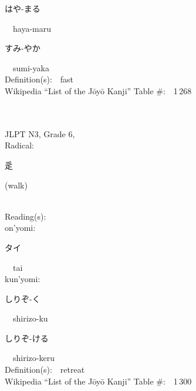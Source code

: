 \begin{multicols}{2}
{\hspace*{2em}}{\begin{CJK}{UTF8}{min} はや-まる \end{CJK}}\ \ haya-maru\ \ \\
{\hspace*{2em}}{\begin{CJK}{UTF8}{min} すみ-やか \end{CJK}}\ \ sumi-yaka\ \ \\
Definition(s):\ \ fast \\
Wikipedia ``List of the J\=oy\=o Kanji'' Table \#:\ \ 1\,268 \\
\ \ \\
{\fontsize{34pt}{40pt}  }\ \ \\  %
{JLPT N3, Grade 6, \\Radical:\ \ {\begin{CJK}{UTF8}{min} 辵 \end{CJK}} (walk) } \\
Reading(s):\ \ \\
{\hspace*{1em}}on'yomi:\ \ \\
{\hspace*{2em}}{\begin{CJK}{UTF8}{min} タイ \end{CJK}}\ \ tai\ \ \\
{\hspace*{1em}}kun'yomi:\ \ \\
{\hspace*{2em}}{\begin{CJK}{UTF8}{min} しりぞ-く \end{CJK}}\ \ shirizo-ku\ \ \\
{\hspace*{2em}}{\begin{CJK}{UTF8}{min} しりぞ-ける \end{CJK}}\ \ shirizo-keru\ \ \\
Definition(s):\ \ retreat \\
Wikipedia ``List of the J\=oy\=o Kanji'' Table \#:\ \ 1\,300 \\
\ \ \\
{\fontsize{34pt}{40pt}  }\ \ \\  %

\end{multicols}

